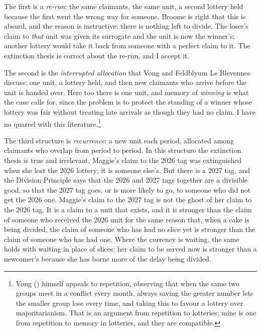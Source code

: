 \documentclass[
  11pt,
  letterpaper,
  DIV=11,
  numbers=noendperiod,
  twoside]{scrartcl}
\begin{document}
The first is a \emph{re-run}: the same claimants, the same unit, a
second lottery held because the first went the wrong way for someone.
Broome is right that this is absurd, and the reason is instructive:
there is nothing left to divide. The loser's claim to \emph{that} unit
was given its surrogate and the unit is now the winner's; another
lottery would take it back from someone with a perfect claim to it. The
extinction thesis is correct about the re-run, and I accept it.

The second is the \emph{interrupted allocation} that Vong and Feldblyum
Le Blevennec discuss: one unit, a lottery held, and then new claimants
who arrive before the unit is handed over. Here too there is one unit,
and memory of \emph{winning} is what the case calls for, since the
problem is to protect the standing of a winner whose lottery was fair
without treating late arrivals as though they had no claim. I have no
quarrel with this literature.\footnote{Vong
  () himself appeals to repetition,
  observing that when the same two groups meet in a conflict every
  month, always saving the greater number lets the smaller group lose
  every time, and taking this to favour a lottery over majoritarianism.
  That is an argument from repetition to lotteries; mine is one from
  repetition to memory in lotteries, and they are compatible.}

The third structure is \emph{recurrence}: a new unit each period,
allocated among claimants who overlap from period to period. In this
structure the extinction thesis is true and irrelevant. Maggie's claim
to the 2026 tag was extinguished when she lost the 2026 lottery; it is
someone else's. But there is a 2027 tag, and the Division Principle says
that the 2026 and 2027 tags together are a divisible good, so that the
2027 tag goes, or is more likely to go, to someone who did not get the
2026 one. Maggie's claim to the 2027 tag is not the ghost of her claim
to the 2026 tag. It is a claim to a unit that exists, and it is stronger
than the claim of someone who received the 2026 unit for the same reason
that, when a cake is being divided, the claim of someone who has had no
slice yet is stronger than the claim of someone who has had one. Where
the currency is waiting, the same holds with waiting in place of slices:
her claim to be served now is stronger than a newcomer's because she has
borne more of the delay being divided.
\end{document}
